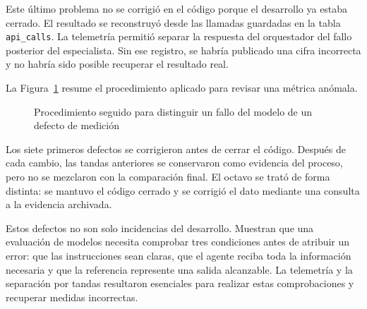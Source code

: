 Este último problema no se corrigió en el código porque el desarrollo ya estaba cerrado. El resultado se reconstruyó desde las llamadas guardadas en la tabla \texttt{api\_calls}. La telemetría permitió separar la respuesta del orquestador del fallo posterior del especialista. Sin ese registro, se habría publicado una cifra incorrecta y no habría sido posible recuperar el resultado real.

La Figura~\ref{fig:revision_instrumentacion} resume el procedimiento aplicado para revisar una métrica anómala.

\begin{figure}[H]
    \centering
    \caption[Revisión de los defectos de instrumentación]{Procedimiento seguido para distinguir un fallo del modelo de un defecto de medición}
    \label{fig:revision_instrumentacion}
\end{figure}

Los siete primeros defectos se corrigieron antes de cerrar el código. Después de cada cambio, las tandas anteriores se conservaron como evidencia del proceso, pero no se mezclaron con la comparación final. El octavo se trató de forma distinta: se mantuvo el código cerrado y se corrigió el dato mediante una consulta a la evidencia archivada.

Estos defectos no son solo incidencias del desarrollo. Muestran que una evaluación de modelos necesita comprobar tres condiciones antes de atribuir un error: que las instrucciones sean claras, que el agente reciba toda la información necesaria y que la referencia represente una salida alcanzable. La telemetría y la separación por tandas resultaron esenciales para realizar estas comprobaciones y recuperar medidas incorrectas.


